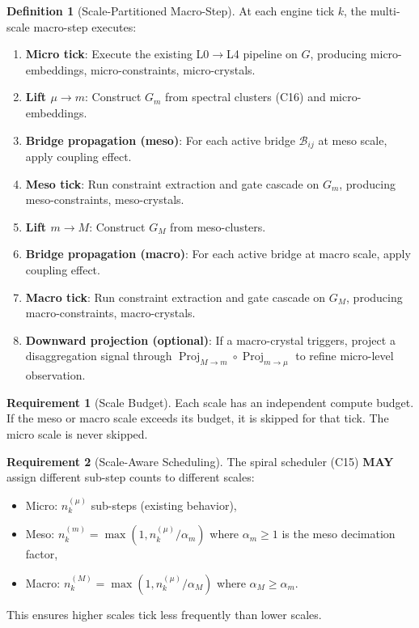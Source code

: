 \documentclass[11pt,a4paper,twoside]{article}
\theoremstyle{definition}
\newtheorem{definition}{Definition}[section]
\newtheorem{requirement}{Requirement}[section]
\theoremstyle{plain}
\theoremstyle{remark}
\newcommand{\calB}{\mathcal{B}}
\DeclareMathOperator{\Proj}{Proj}
\begin{document}
\begin{definition}[Scale-Partitioned Macro-Step]\label{def:scalemacro}
At each engine tick $k$, the multi-scale macro-step executes:
\begin{enumerate}[nosep,label=(MS\arabic*)]
  \item \textbf{Micro tick}: Execute the existing L0$\to$L4 pipeline
        on $G$, producing micro-embeddings, micro-constraints,
        micro-crystals.
  \item \textbf{Lift $\mu \to m$}: Construct $G_m$ from spectral
        clusters (C16) and micro-embeddings.
  \item \textbf{Bridge propagation (meso)}: For each active bridge
        $\calB_{ij}$ at meso scale, apply coupling effect.
  \item \textbf{Meso tick}: Run constraint extraction and gate cascade
        on $G_m$, producing meso-constraints, meso-crystals.
  \item \textbf{Lift $m \to M$}: Construct $G_M$ from meso-clusters.
  \item \textbf{Bridge propagation (macro)}: For each active bridge at
        macro scale, apply coupling effect.
  \item \textbf{Macro tick}: Run constraint extraction and gate cascade
        on $G_M$, producing macro-constraints, macro-crystals.
  \item \textbf{Downward projection (optional)}: If a macro-crystal
        triggers, project a disaggregation signal through
        $\Proj_{M \to m} \circ \Proj_{m \to \mu}$ to refine
        micro-level observation.
\end{enumerate}
\end{definition}

\begin{requirement}[Scale Budget]\label{req:scalebudget}
Each scale has an independent compute budget. If the meso or macro
scale exceeds its budget, it is skipped for that tick. The micro scale
is never skipped.
\end{requirement}

\begin{requirement}[Scale-Aware Scheduling]\label{req:scalesched}
The spiral scheduler (C15) \textbf{MAY} assign different sub-step
counts to different scales:
\begin{itemize}[nosep]
  \item Micro: $n_k^{(\mu)}$ sub-steps (existing behavior),
  \item Meso: $n_k^{(m)} = \max(1, n_k^{(\mu)} / \alpha_m)$ where
        $\alpha_m \ge 1$ is the meso decimation factor,
  \item Macro: $n_k^{(M)} = \max(1, n_k^{(\mu)} / \alpha_M)$ where
        $\alpha_M \ge \alpha_m$.
\end{itemize}
This ensures higher scales tick less frequently than lower scales.
\end{requirement}
\end{document}
